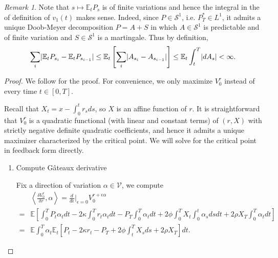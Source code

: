 \documentclass[openany,oneside]{article}
\theoremstyle{definition}
\theoremstyle{remark}
\newtheorem{rem}[thm]{Remark}
\newcommand{\E}{\mathbb{E}} %
\DeclarePairedDelimiter{\abs}{\lvert}{\rvert} %
\begin{document}
\begin{rem}
Note that $s\mapsto \E_t P_s$ is of finite variations and hence the integral in the of definition of $v_1(t)$ makes sense. Indeed, since $P\in \mathcal{S}^1$, i.e. $P^\ast_T \in L^1$, it admits a unique Doob-Meyer decomposition $P=A+S$ in which $A\in\mathcal{S}^1$ is predictable and of finite variation and $S\in\mathcal{S}^1$ is a martingale. Thus by definition, $$\sum_i \abs{\E_t P_{s_i} - \E_t P_{s_{i-1}}} \le \E_t\left[\sum_i \abs{A_{s_i} - A_{s_{i-1}}}\right] \le \E_t \int_t^T \abs{d A_s} < \infty.$$
\end{rem}

\begin{proof}
We follow \cite{bouchard2017equilibrium} for the proof. For convenience, we only maximize $V^r_0$ instead of every time $t\in[0,T]$.

Recall that $X_t = x-\int_0^t r_s ds$, so $X$ is an affine function of $r$. It is straightforward that $V^r_0$ is a quadratic functional (with linear and constant terms) of $(r,X)$ with strictly negative definite quadratic coefficients, and hence it admits a unique maximizer characterized by the critical point. We will solve for the critical point in feedback form directly.

\begin{enumerate}[Step 1.]
\item Compute G\^ateaux derivative

Fix a direction of variation $\alpha \in \mathcal{V}$, we compute
\begin{align*}
& \left\langle \frac{\delta V^r_0}{\delta r}, \alpha \right\rangle = \frac{d}{d\epsilon}\Big\vert_{\epsilon=0} V^{r+\epsilon\alpha}_0  \\
=& \E\left[\int_0^T P_t \alpha_t dt - 2\kappa\int_0^T r_t \alpha_t dt - P_T \int_0^T \alpha_t dt + 2\phi\int_0^T X_t \int_0^t \alpha_s ds dt + 2\rho X_T \int_0^T \alpha_t dt \right] \\
=& \E\int_0^T \alpha_t \E_t\left[P_t - 2\kappa r_t - P_T + 2\phi\int_t^T X_s ds + 2\rho X_T \right] dt.
\end{align*}


\end{enumerate}
\end{proof}
\end{document}
